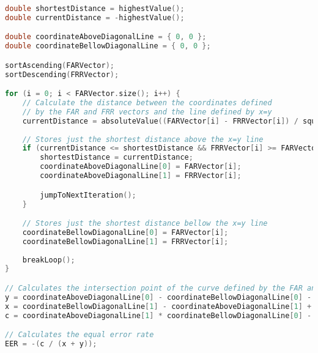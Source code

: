\begin{lstlisting}[language=C++, caption={EER algorithm}, label={lst:EERAlgo}]
double shortestDistance = highestValue();
double currentDistance = -highestValue();

double coordinateAboveDiagonalLine = { 0, 0 };
double coordinateBellowDiagonalLine = { 0, 0 };

sortAscending(FARVector);
sortDescending(FRRVector);

for (i = 0; i < FARVector.size(); i++) {
	// Calculate the distance between the coordinates defined
	// by the FAR and FRR vectors and the line defined by x=y
	currentDistance = absoluteValue((FARVector[i] - FRRVector[i]) / squaredRoot(2));
	
	// Stores just the shortest distance above the x=y line
	if (currentDistance <= shortestDistance && FRRVector[i] >= FARVector[i]) {
		shortestDistance = currentDistance;
		coordinateAboveDiagonalLine[0] = FARVector[i];
		coordinateAboveDiagonalLine[1] = FRRVector[i];

		jumpToNextIteration();
	}

	// Stores just the shortest distance bellow the x=y line
	coordinateBellowDiagonalLine[0] = FARVector[i];
	coordinateBellowDiagonalLine[1] = FRRVector[i];
	
	breakLoop();
}

// Calculates the intersection point of the curve defined by the FAR and FRR points and the x=y line
y = coordinateAboveDiagonalLine[0] - coordinateBellowDiagonalLine[0] - 1;
x = coordinateBellowDiagonalLine[1] - coordinateAboveDiagonalLine[1] + 1;
c = coordinateAboveDiagonalLine[1] * coordinateBellowDiagonalLine[0] - coordinateAboveDiagonalLine[0] * coordinateBellowDiagonalLine[1];

// Calculates the equal error rate
EER = -(c / (x + y));
\end{lstlisting}